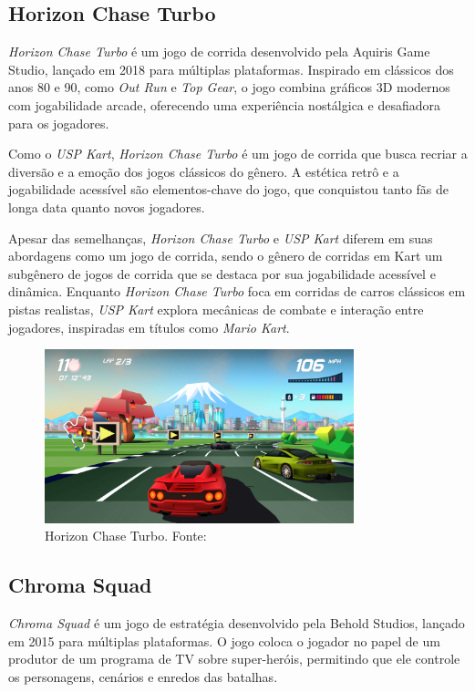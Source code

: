 \subsection{Horizon Chase Turbo}
\textit{Horizon Chase Turbo} é um jogo de corrida desenvolvido pela Aquiris Game Studio, lançado em 2018 para múltiplas plataformas. Inspirado em clássicos dos anos 80 e 90, como \textit{Out Run} e \textit{Top Gear}, o jogo combina gráficos 3D modernos com jogabilidade arcade, oferecendo uma experiência nostálgica e desafiadora para os jogadores.

Como o \textit{USP Kart}, \textit{Horizon Chase Turbo} é um jogo de corrida que busca recriar a diversão e a emoção dos jogos clássicos do gênero. A estética retrô e a jogabilidade acessível são elementos-chave do jogo, que conquistou tanto fãs de longa data quanto novos jogadores.

Apesar das semelhanças, \textit{Horizon Chase Turbo} e \textit{USP Kart} diferem em suas abordagens como um jogo de corrida, sendo o gênero de corridas em Kart um subgênero de jogos de corrida que se destaca por sua jogabilidade acessível e dinâmica. Enquanto \textit{Horizon Chase Turbo} foca em corridas de carros clássicos em pistas realistas, \textit{USP Kart} explora mecânicas de combate e interação entre jogadores, inspiradas em títulos como \textit{Mario Kart}.

\begin{figure}[H]
    \centering
    \includegraphics[width=0.8\textwidth]{figuras/Horizon Chase Turbo.jpeg}
    \caption{Horizon Chase Turbo. Fonte: \cite{horizonChaseTurbo}}
    \label{fig:horizon-chase-turbo}
\end{figure}

\subsection{Chroma Squad}
\textit{Chroma Squad} é um jogo de estratégia desenvolvido pela Behold Studios, lançado em 2015 para múltiplas plataformas. O jogo coloca o jogador no papel de um produtor de um programa de TV sobre super-heróis, permitindo que ele controle os personagens, cenários e enredos das batalhas.

